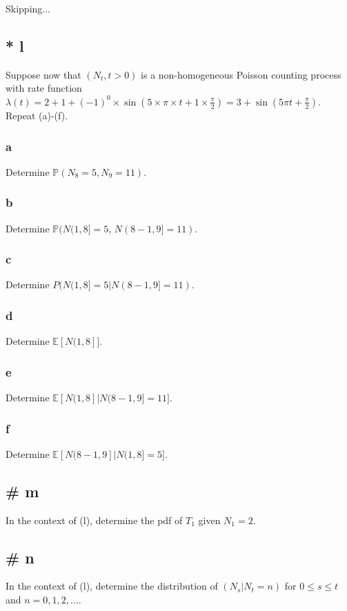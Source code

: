 \documentclass{article}
\newcommand{\prob}{\mathbb{P}}
\newcommand{\expect}{\mathbb{E}}
\begin{document}
Skipping...

\subsection{* l}
Suppose now that $(N_t, t > 0)$ is a non-homogeneous Poisson counting process
with rate function $\lambda(t) = 2 + 1 + (-1)^0 \times 
\sin\left(5 \times \pi \times t + 1 \times \frac{\pi}{2}\right)
= 3 + \sin\left(5\pi t + \frac{\pi}{2}\right)$. Repeat (a)-(f).

\subsubsection{a}
Determine $\prob(N_8 = 5, N_9 = 11)$.

\subsubsection{b}
Determine $\prob(N(1, 8] = 5$, $N(8 - 1, 9] = 11)$.

\subsubsection{c}
Determine $P(N(1, 8] = 5 | N(8 - 1, 9] = 11)$.

\subsubsection{d}
Determine $\expect[N (1, 8]]$.

\subsubsection{e}
Determine $\expect[N(1, 8] | N(8 - 1, 9] = 11]$.

\subsubsection{f}
Determine $\expect[N(8 - 1, 9] | N(1, 8] = 5]$.

\subsection{\# m}
In the context of (l), determine the pdf of $T_1$ given $N_1 = 2$.


\subsection{\# n}
In the context of (l), determine the distribution of $(N_s | N_t = n)$
for $0 \leq s \leq t$ and $n = 0, 1, 2, \ldots$.
\end{document}
